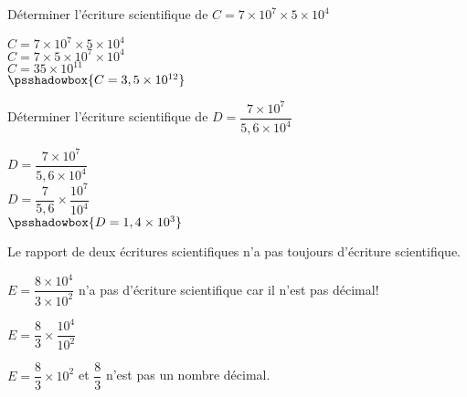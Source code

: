 \begin{methode*1}
    \exercice
    Déterminer l'écriture scientifique de $C=7\times 10^7 \times 5 \times 10^4$
    \correction

    $C=7\times 10^7 \times 5 \times 10^4$\\
    $C=7 \times 5 \times 10^7 \times 10^4$\\
    $C=35 \times 10^{11}$\\ 
    $\psshadowbox{C=3,5 \times 10^{12}}$ 
\end{methode*1}

\begin{methode*1}
    \exercice
    Déterminer l'écriture scientifique de $D=\dfrac{7\times 10^7}{5,6 \times 10^4}$
    \correction

    $D=\dfrac{7\times 10^7}{5,6 \times 10^4}$\\
    $D=\dfrac{7}{5,6}\times \dfrac{10^7}{10^4}$\\
    $\psshadowbox{D=1,4\times 10^3}$
\end{methode*1}

\begin{myBox}{  }
    Le rapport de deux écritures scientifiques n'a pas toujours d'écriture scientifique.

    \medskip
    {\raggedright
    $E=\dfrac{8\times 10^4}{3 \times 10^2}$ n'a pas d'écriture scientifique car il n'est pas décimal!

    \smallskip
    $E=\dfrac{8}{3}\times \dfrac{10^4}{10^2}$

    \smallskip
    $E=\dfrac{8}{3}\times 10^2$ et $\dfrac{8}{3}$ n'est pas un nombre décimal.

    }
\end{myBox}